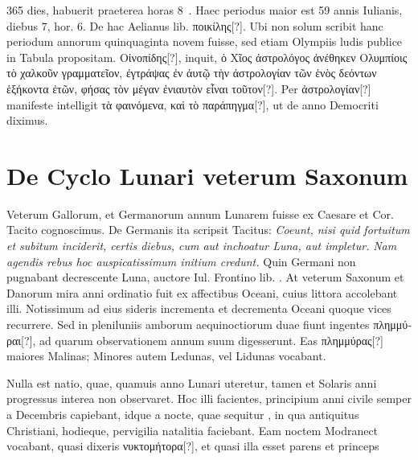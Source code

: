 365 dies, habuerit praeterea horas 8~.
Haec periodus maior est 59
annis Iulianis, diebus 7, hor. 6.
De hac Aelianus lib.  \textgreek{ποικίλης[?]}. %
Ubi non solum scribit hanc periodum annorum quinquaginta novem
fuisse, sed etiam Olympiis ludis publice in Tabula propositam.
\textgreek{Οἰνοπίδης[?]},
inquit, \textgreek{ὁ Χῖος ἀστρολόγος ἀνέθηκεν Ολυμπίοις τὸ χαλκοῦν γραμματεῖον,
ἐγτράψας ἐν ἀυτῷ τὴν ἀστρολογίαν τῶν ἑνὸς δεόντων ἑξήκοντα ἐτῶν, φήσας
τὸν μέγαν ἐνιαυτὸν εἶναι τοῦτον[?]}.
%
Per \textgreek{ἀστρολογίαν[?]}
 manifeste intelligit \textgreek{τὰ
φαινόμενα, καὶ τὸ παράπηγμα[?]}, ut de anno Democriti diximus.
%
\section{De Cyclo Lunari veterum Saxonum}
%
Veterum Gallorum, et Germanorum annum Lunarem
fuisse ex Caesare et Cor. Tacito cognoscimus. %
De Germanis ita scripsit Tacitus:
 \textit{Coeunt, nisi quid fortuitum et subitum inciderit,
certis diebus, cum aut inchoatur Luna, aut impletur.}
\textit{Nam
agendis rebus hoc auspicatissimum initium credunt.}
Quin Germani
non pugnabant decrescente Luna, auctore Iul. Frontino lib. . %
At
veterum Saxonum et Danorum mira anni ordinatio fuit ex affectibus
Oceani, cuius littora accolebant illi.
Notissimum ad eius sideris
incrementa et decrementa Oceani quoque vices recurrere.
Sed in
pleniluniis amborum aequinoctiorum duae fiunt ingentes \textgreek{πλημμύραι[?]},
ad quarum observationem annum suum digesserunt.
Eas \textgreek{πλημμύρας[?]}
maiores Malinas; Minores autem Ledunas, vel Lidunas vocabant.
\begin{table}[tb]
  
\end{table}
%
Nulla est natio, quae, quamuis anno Lunari uteretur, tamen et Solaris
anni progressus interea non observaret.
%
Hoc illi facientes,
principium anni civile semper a  Decembris capiebant, idque a
nocte, quae sequitur , in qua antiquitus Christiani, hodieque,
pervigilia natalitia faciebant.
Eam noctem Modranect vocabant,
quasi dixeris \textgreek{νυκτομήτορα[?]}, et quasi illa esset parens et princeps
